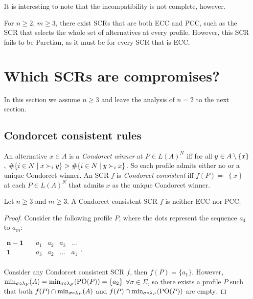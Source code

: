 \documentclass[version=3.21, pagesize, twoside=off, bibliography=totoc, DIV=calc, fontsize=12pt, a4paper]{scrartcl}
\begin{document}
It is interesting to note that the incompatibility is not complete, however.

\begin{remark}
	For $n ≥ 2$, $m ≥ 3$, there exist SCRs that are both ECC and PCC, such as the SCR that selects the whole set of alternatives at every profile. However, this SCR fails to be Paretian, as it must be for every SCR that is ECC.
\end{remark}


\section{Which SCRs are compromises?}
\label{sec:more2voters}
In this section we assume $n\geq 3$ and leave the analysis of $n=2$ to the
next section.

\subsection{Condorcet consistent rules}

An alternative $x\in A$ is a \textit{Condorcet winner} at $P\in L(A)^{N}$ iff for all $y\in A \setminus \{x\} $, $\#\set{i \in N \suchthat x \prefi y} >\#\set{i \in N \suchthat y \prefi x}$. So each profile admits
either no or a unique Condorcet winner. An SCR $f$ is \textit{Condorcet
consistent} iff $f(P)=$ $\left\{ x\right\} $ at each $P\in L(A)^{N}$ that
admits $x$ as the unique Condorcet winner.

\begin{theorem} \label{th:condorcet}
Let $n\geq 3$ and $m\geq 3$. A Condorcet consistent SCR $f$ is neither ECC nor PCC.
\end{theorem}
\begin{proof}
Consider the following profile $P$, where the dots represent the sequence $a_4$ to $a_m$:
	\begin{center}
		$
		\begin{array}{cccccc}
		\mathbf{n-1} \quad &a_1&a_2&a_3&\dots\\
		\mathbf{1} \quad &a_3&a_2&\dots&a_1\\
		\end{array}
		$.
	\end{center}

Consider any Condorcet consistent SCR $f$, then $f(P)=\{a_1\}$. However, $\musigma=\mustar=\{a_2\}$ $\forall \sigma \in \Sigma$, so there exists a profile $P$ such that both $f(P)\cap \musigma$ and $f(P)\cap \mustar$ are empty.
\end{proof}
\end{document}

